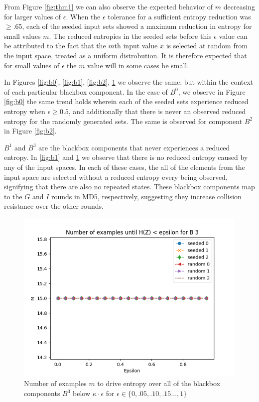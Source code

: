 \documentclass[letterpaper,twocolumn,10pt]{article}
\begin{document}
From Figure \ref{fig:thm1} we can also observe the expected behavior of $m$ decreasing for larger values of $\epsilon$. When the $\epsilon$ tolerance for a sufficient entropy reduction was $\geq .65$, each of the seeded input sets showed a maximum reduction in entropy for small values $m$. The reduced entropies in the seeded sets before this $\epsilon$ value can be attributed to the fact that the $m$th input value $x$ is selected at random from the input space, treated as a uniform distrobution. It is therefore expected that for small values of $\epsilon$ the $m$ value will in some cases be small.


In Figures \ref{fig:b0}, \ref{fig:b1}, \ref{fig:b2}, \ref{fig:b3} we observe the same, but within the context of each particular blackbox component. In the case of $B^0$, we observe in Figure \ref{fig:b0} the same trend holds wherein each of the seeded sets experience reduced entropy when $\epsilon \geq 0.5$, and additionally that there is never an observed reduced entropy for the randomly generated sets. The same is observed for component $B^2$ in Figure \ref{fig:b2}.

$B^1$ and $B^3$ are the blackbox components that never experiences a reduced entropy. In \ref{fig:b1} and \ref{fig:b3} we observe that there is no reduced entropy caused by any of the input spaces. In each of these cases, the all of the elements from the input space are selected without a reduced entropy every being observed, signifying that there are also no repeated states. These blackbox components map to the $G$ and $I$ rounds in MD5, respectively, suggesting they increase collision resistance over the other rounds. 

\begin{figure}
\includegraphics[width=\linewidth]{figs/seeded_3.png}
\caption{\label{fig:b3} Number of examples $m$ to drive entropy over all of the blackbox components $B^{3}$ below $\kappa \cdot \epsilon$ for $\epsilon \in \{0, .05, .10, .15...,1\}$ }
\end{figure}
\end{document}
